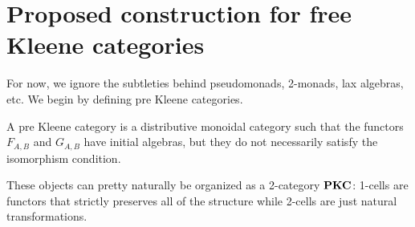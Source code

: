 \documentclass[acmsmall,anonymous,review,screen]{acmart}
\newcommand{\cat}[1]{
  \relax
  \StrLen{#1}[\arglength]
  \ifnum\arglength=1
  \mathcal{#1}
  \else
  \mathbf{#1}
  \fi
}
\begin{document}
\begin{comment}
  We define the DFA with relation $(X, \mathcal{S}^*)$, where
  $\mathcal{S} = \{ (x_1, x_2) \mid f(x_1) \mathcal{S} f(x_2)\}$.
  We now prove that $\mathcal{S}^*$ is a simulation relation.
  \begin{description}
  \item[Preorder:] It follows directly from the fact that $\mathcal{S}$
    is a preorder.
  \item[Preserves acceptance:] Assume that $f(x_1) \mathcal{S} f(x_2)$
    and that $x_1$ is an accepting state. Since $f$ is a DFA morphism,
    it follows that $f(x)$ is an accepting state if, and only if, $x$
    is accepting. Since by assumption $\mathcal{S}$ is a simulation
    relation, we can conclude that $f(x_2)$ is an accepting state and
    so is $x_2$.
  \item[Stable under transition:] Assume that $f(x_1) \mathcal{S} f(x_2)$,
    $\delta_a(x_1) = x'_1$ and $\delta_a(x_2) = x'_2$. We want to
    show that $f(x'_1) \mathcal{S} f(x'_2)$. By assumption that $f$ is
    a DFA morphism, we have $f \circ \delta_a = \delta'_a \circ f$,
    for every character $a : \Sigma$. Therefore, we have to prove that
    $\delta'_a(f(x_1)) \mathcal{S} \delta'_a(f(x_2))$. This follows
    by the assumption that $\mathcal{S}$ is a simulation relation.
  \end{description}

  Therefore $(X, \mathcal{S}^*)$ is indeed a lifting of $X$.
  Showing that it is the Cartesian lifting follows by unfolding
  the definitions and using the fact that $U$ is faithful.
\end{proof}
\end{comment}


\section{Proposed construction for free Kleene categories}

For now, we ignore the subtleties behind pseudomonads, 2-monads,
lax algebras, etc. We begin by defining pre Kleene categories.

\begin{definition}
  A pre Kleene category is a distributive monoidal category such that
  the functors $F_{A, B}$ and $G_{A, B}$ have initial algebras, but
  they do not necessarily satisfy the isomorphism condition.
\end{definition}

These objects can pretty naturally be organized as a 2-category
$\cat{PKC}$: 1-cells are functors that strictly preserves all of the
structure while 2-cells are just natural transformations.
\end{document}
